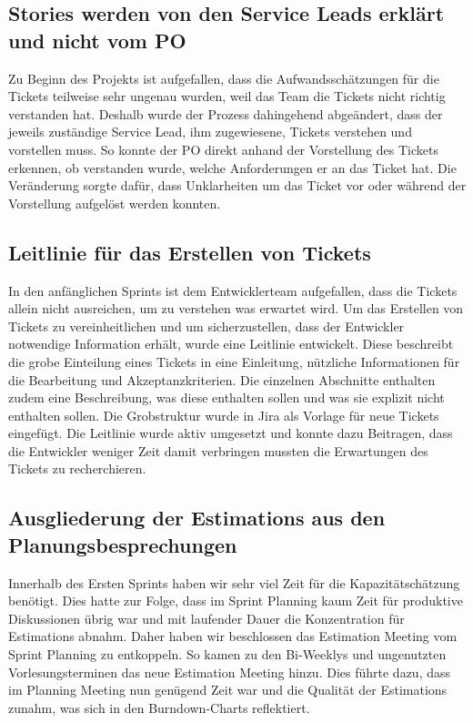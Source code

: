 \subsection{Stories werden von den Service Leads erklärt und nicht vom PO}
Zu Beginn des Projekts ist aufgefallen, dass die Aufwandsschätzungen für die Tickets 
teilweise sehr ungenau wurden, weil das Team die Tickets nicht richtig verstanden hat. 
Deshalb wurde der Prozess dahingehend abgeändert, dass der jeweils zuständige Service 
Lead, ihm zugewiesene, Tickets verstehen und vorstellen muss. So konnte der PO direkt 
anhand der Vorstellung des Tickets erkennen, ob verstanden wurde, welche Anforderungen 
er an das Ticket hat. Die Veränderung sorgte dafür, dass Unklarheiten um das Ticket vor
oder während der Vorstellung aufgelöst werden konnten. 

\subsection{Leitlinie für das Erstellen von Tickets}
In den anfänglichen Sprints ist dem Entwicklerteam aufgefallen, dass die Tickets allein nicht ausreichen, 
um zu verstehen was erwartet wird. Um das Erstellen von Tickets zu vereinheitlichen und um sicherzustellen, 
dass der Entwickler notwendige Information erhält, wurde eine Leitlinie entwickelt. 
Diese beschreibt die grobe Einteilung eines Tickets in eine Einleitung, nützliche Informationen für die 
Bearbeitung und Akzeptanzkriterien. Die einzelnen Abschnitte enthalten zudem eine Beschreibung, was diese 
enthalten sollen und was sie explizit nicht enthalten sollen. Die Grobstruktur wurde in Jira als Vorlage 
für neue Tickets eingefügt.
Die Leitlinie wurde aktiv umgesetzt und konnte dazu Beitragen, dass die Entwickler weniger Zeit damit 
verbringen mussten die Erwartungen des Tickets zu recherchieren. 

\subsection{Ausgliederung der Estimations aus den Planungsbesprechungen}

Innerhalb des Ersten Sprints haben wir sehr viel Zeit für die Kapazitätschätzung benötigt. 
Dies hatte zur Folge, dass im Sprint Planning kaum Zeit für produktive Diskussionen übrig war und mit laufender Dauer die Konzentration für Estimations abnahm.
Daher haben wir beschlossen das Estimation Meeting vom Sprint Planning zu entkoppeln.
So kamen zu den Bi-Weeklys und ungenutzten Vorlesungsterminen das neue Estimation Meeting hinzu.
Dies führte dazu, dass im Planning Meeting nun genügend Zeit war und die Qualität der Estimations zunahm, was sich in den Burndown-Charts reflektiert.

